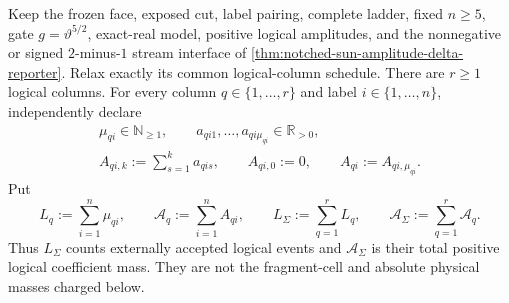 \begin{theorem}
\label{thm:notched-sun-columnwise-amplitude-delta-reporter}
Keep the frozen face, exposed cut, label pairing, complete ladder, fixed
$n\geq5$, gate $g=\vartheta^{5/2}$, exact-real model, positive logical
amplitudes, and the nonnegative or signed $2$-minus-$1$ stream interface of
\cref{thm:notched-sun-amplitude-delta-reporter}.  Relax exactly its common
logical-column schedule.  There are $r\geq1$ logical columns.  For every
column $q\in\{1,\ldots,r\}$ and label $i\in\{1,\ldots,n\}$, independently
declare
\begin{equation}
 \begin{gathered}
  \mu_{qi}\in\mathbb N_{\geq1},
  \qquad
  a_{qi1},\ldots,a_{qi\mu_{qi}}\in\mathbb R_{>0},\\
  A_{qi,k}:=\sum_{s=1}^{k}a_{qis},
  \qquad A_{qi,0}:=0,
  \qquad
  A_{qi}:=A_{qi,\mu_{qi}}.
 \end{gathered}
 \label{eq:notched-sun-columnwise-amplitude-schedule}
\end{equation}
Put
\begin{equation}
 L_q:=\sum_{i=1}^{n}\mu_{qi},
 \qquad
 \mathcal A_q:=\sum_{i=1}^{n}A_{qi},
 \qquad
 L_\Sigma:=\sum_{q=1}^{r}L_q,
 \qquad
 \mathcal A_\Sigma:=\sum_{q=1}^{r}\mathcal A_q.
 \label{eq:notched-sun-columnwise-amplitude-totals}
\end{equation}
Thus $L_\Sigma$ counts externally accepted logical events and
$\mathcal A_\Sigma$ is their total positive logical coefficient mass.  They
are not the fragment-cell and absolute physical masses charged below.


\end{theorem}
